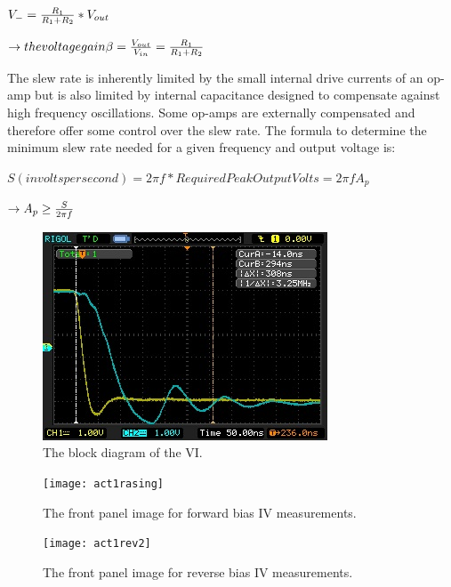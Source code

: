 \documentclass[11pt]{article}
\begin{document}
$V_{-}={R_{1}\over R_{1}+R_{2}}*V_{out}$

$\rightarrow the voltage gain \beta = {V_{out}\over V_{in}}={R_{1}\over R_{1}+R_{2}}$

The slew rate is inherently limited by the small internal drive currents of an op-amp but is also limited by internal capacitance designed to compensate against high frequency oscillations. Some op-amps are externally compensated and therefore offer some control over the slew rate. The formula to determine the minimum slew rate needed for a given frequency and output voltage is:

$S(in volts per second)=2\pi f*Required Peak Output Volts=2\pi fA_{p}$

$\rightarrow A_{p}\geq {S\over 2\pi f}$


\begin{figure}[H]
 \begin{center}
  \includegraphics[width=\linewidth/1]{act1falling}
  \caption{The block diagram of the VI.}
  \label{fig:act1falling}
 \end{center}
\end{figure}

\begin{figure}[H]
 \begin{center}
  \texttt{[image: act1rasing]}
  \caption{The front panel image for forward bias IV measurements.}
  \label{fig:act1raising}
 \end{center}
\end{figure}

\begin{figure}[H]
 \begin{center}
  \texttt{[image: act1rev2]}
  \caption{The front panel image for reverse bias IV measurements.}
  \label{fig:act1rev2}
 \end{center}
\end{figure}
\end{document}
